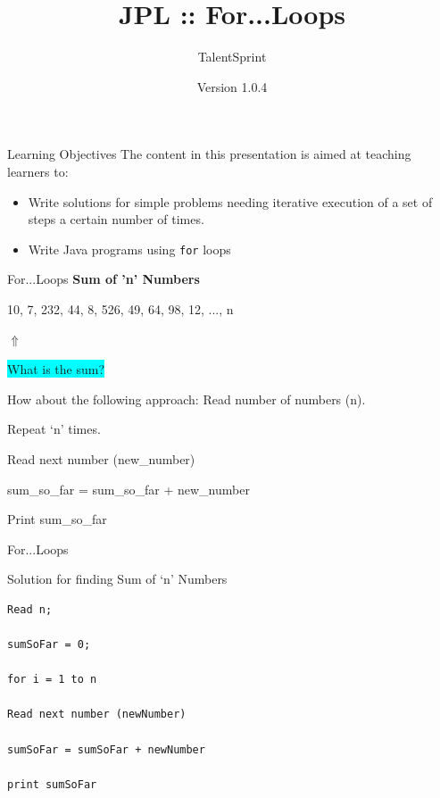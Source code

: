\documentclass[14pt]{beamer}
\title[JPL:Java:01]{JPL :: For...Loops}
\author[TS]{TalentSprint}
\institute[L\&D]{Licensed To Skill}
\date{Version 1.0.4}
\begin{document}
\begin{frame}
  \titlepage
\end{frame}

\begin{frame}{Learning Objectives}
The content in this presentation is aimed at teaching  learners to:
  \begin{itemize}
  \item Write solutions for simple problems needing iterative execution of a set of steps a certain number of times.
  \item Write Java programs using \lstinline!for! loops 
  \end{itemize}
\end{frame}

\begin{frame}[fragile]{For...Loops}
\textbf{Sum of 'n' Numbers}

\vspace{1pc}

\colorbox{white}{10, 7, 232, 44, 8, 526, 49, 64, 98, 12, ..., n}

\hspace{4cm}$\Uparrow$

\hspace{2cm}\colorbox{cyan}{What is the sum?}
\begin{block}{How about the following approach:}
Read number of numbers (n). 

Repeat `n' times.

Read next number (new\_number)

sum\_so\_far = sum\_so\_far + new\_number 

Print sum\_so\_far

\end{block}

\end{frame}

\begin{frame}[fragile]{For...Loops}
\begin{block}{Solution for finding Sum of `n' Numbers}
\begin{lstlisting}[numbers=none]
Read n;

sumSoFar = 0;

for i = 1 to n

Read next number (newNumber)

sumSoFar = sumSoFar + newNumber

print sumSoFar

\end{lstlisting}
\end{block}
\end{frame}
\end{document}
